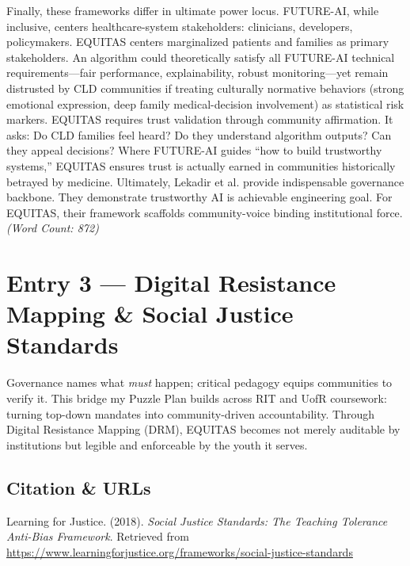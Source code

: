 \documentclass[11pt,twoside]{article}
\begin{document}
Finally, these frameworks differ in ultimate power locus. FUTURE-AI, while inclusive, centers healthcare-system stakeholders: clinicians, developers, policymakers. \textsc{EQUITAS} centers marginalized patients and families as primary stakeholders. An algorithm could theoretically satisfy all FUTURE-AI technical requirements---fair performance, explainability, robust monitoring---yet remain distrusted by CLD communities if treating culturally normative behaviors (strong emotional expression, deep family medical-decision involvement) as statistical risk markers. \textsc{EQUITAS} requires trust validation through community affirmation. It asks: Do CLD families feel heard? Do they understand algorithm outputs? Can they appeal decisions? Where FUTURE-AI guides ``how to build trustworthy systems,'' \textsc{EQUITAS} ensures trust is actually earned in communities historically betrayed by medicine. Ultimately, Lekadir et al. provide indispensable governance backbone. They demonstrate trustworthy AI is achievable engineering goal. For \textsc{EQUITAS}, their framework scaffolds community-voice binding institutional force. \textit{(Word Count: 872)}

\newpage

\label{entry3}

\section*{Entry 3 --- Digital Resistance Mapping \& Social Justice Standards}

\vspace{-0.3cm}

Governance names what \emph{must} happen; critical pedagogy equips communities to verify it. This bridge my Puzzle Plan builds across RIT and UofR coursework: turning top-down mandates into community-driven accountability. Through Digital Resistance Mapping (DRM), \textsc{EQUITAS} becomes not merely auditable by institutions but legible and enforceable by the youth it serves.

\vspace{-0.3cm}

\subsection*{Citation \& URLs}

\vspace{-0.3cm}

Learning for Justice. (2018). \textit{Social Justice Standards: The Teaching Tolerance Anti-Bias Framework}. Retrieved from \\
\href{https://www.learningforjustice.org/frameworks/social-justice-standards}{https://www.learningforjustice.org/frameworks/social-justice-standards}
\end{document}
